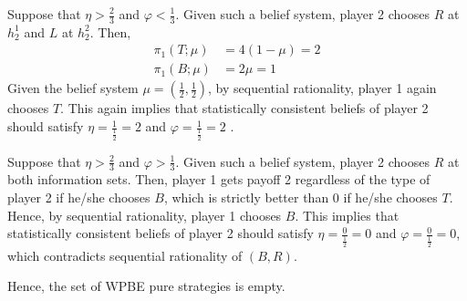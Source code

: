 \documentclass[]{article}
\begin{document}
Suppose that $\eta > \frac{2}{3}$ and $\varphi < \frac{1}{3}$. Given such a belief system, player 2 chooses $R$ at $h_2^1$ and $L$ at $h_2^2$. Then, 
\begin{equation}
\begin{split}
\pi_1(T; \mu)& = 4(1 - \mu) = 2 \\
\pi_1(B; \mu)& = 2\mu = 1 \nonumber
\end{split}
\end{equation}
Given the belief system $\mu = (\frac{1}{2}, \frac{1}{2})$, by sequential rationality, player 1 again chooses $T$. This again implies that statistically consistent beliefs of player 2 should satisfy $\eta = \frac{1}{\frac{1}{2}} = 2$ and $\varphi = \frac{1}{\frac{1}{2}} = 2$ \Lightning.
 
Suppose that $\eta > \frac{2}{3}$ and $\varphi > \frac{1}{3}$. Given such a belief system, player 2 chooses $R$ at both information sets. Then, player 1 gets payoff 2 regardless of the type of player 2 if he/she chooses $B$, which is strictly better than 0 if he/she chooses $T$. Hence, by sequential rationality, player 1 chooses $B$. This implies that statistically consistent beliefs of player 2 should satisfy $\eta = \frac{0}{\frac{1}{2}} = 0$ and $\varphi = \frac{0}{\frac{1}{2}} = 0$, which contradicts sequential rationality of $(B, R)$.

Hence, the set of WPBE pure strategies is empty.
\end{document}
